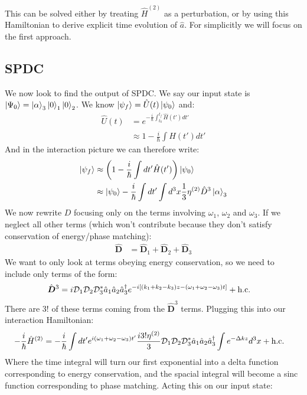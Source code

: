 This can be solved either by treating $\hat{H}^{(2)}$ as a perturbation, or by using this Hamiltonian to derive explicit time evolution of $\hat{a}$.
For simplicitly we will focus on the first approach.

\subsection{SPDC}
We now look to find the output of SPDC. We say our input state is $\ket{\Psi_0} = \ket{\alpha}_3\ket{0}_1\ket{0}_2$. We know $\ket{\psi_f} = \hat{U}(t)\ket{\psi_0}$ and:
\begin{align*}
	\hat{U}(t) &= e^{-\frac{i}{\hbar} \int_{t_0}^{t_f} \hat{H}(t')dt'} \\
	&\approx 1 - \frac{i}{\hbar} \int \hat{H}(t')dt'
\end{align*}
And in the interaction picture we can therefore write:
\begin{align*}
	\ket{\psi_f} &\approx \left(1 - \frac{i}{\hbar} \int dt' \hat{H}(t')\right) \ket{\psi_0} \\
	&\approx \ket{\psi_0} - \frac{i}{\hbar} \int dt' \int d^3 x \frac{1}{3} \eta^{(2)} \hat{D}^3\ket{\alpha}_3
\end{align*}
We now rewrite $D$ focusing only on the terms involving $\omega_1$, $\omega_2$ and $\omega_3$. If we neglect all other terms (which won't contribute because they don't satisfy conservation of energy/phase matching):
\begin{align*}
	\hat{\bm{D}} &= \hat{\bm{D}}_1 + \hat{\bm{D}}_2 + \hat{\bm{D}}_3
\end{align*}
We want to only look at terms obeying energy conservation, so we need to include only terms of the form:
\begin{align*}
	\hat{\bm{D}}^3 &= i\mathcal{D}_1\mathcal{D}_2\mathcal{D}_3^* \hat{a}_1\hat{a}_2\hat{a}_3^\dagger e^{-i [(k_1 + k_2 -k_3)z  -(\omega_1 + \omega_2 - \omega_3)t]} + \text{h.c.}
\end{align*}
There are $3!$ of these terms coming from the $\hat{\bm{D}}^3$ terms. Plugging this into our interaction Hamiltonian:
\begin{align*}
	-\frac{i}{\hbar}\hat{H}^{(2)} &= -\frac{i}{\hbar} \int dt' e^{i(\omega_1 + \omega_2 - \omega_3)t'} \frac{i3!\eta^{(2)}}{3} \mathcal{D}_1\mathcal{D}_2\mathcal{D}_3^* \hat{a}_1\hat{a}_2\hat{a}_3^\dagger \int e^{-\Delta k z} d^3 x + \text{h.c.}
\end{align*}
Where the time integral will turn our first exponential into a delta function corresponding to energy conservation, and the spacial integral will become a sinc function corresponding to phase matching. Acting this on our input state:
